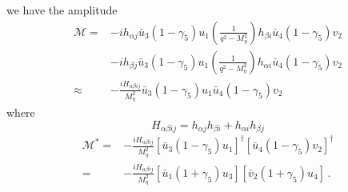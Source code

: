 we have the amplitude 
\begin{align}
  \mathcal{M}=&-i
  h_{\alpha j}\bar{u}_3(1-\gamma_5)u_1\left(\frac{1}{q^2-M_\eta^2}\right)h_{\beta i}\bar{u}_4(1-\gamma_5)v_2\nonumber\\
  &-i h_{\beta j}\bar{u}_3(1-\gamma_5)u_1\left(\frac{1}{q^2-M_\eta^2}\right)h_{\alpha i}\bar{u}_4(1-\gamma_5)v_2\nonumber\\
  \approx&-\frac{iH_{\alpha\beta ij}}{{M_\eta^2}}\bar{u}_3(1-\gamma_5)u_1\bar{u}_4(1-\gamma_5)v_2
\end{align}
where
\begin{equation}
  H_{\alpha\beta ij}=h_{\alpha j}h_{\beta i}+h_{\alpha i}h_{\beta j}
\end{equation}
\begin{align}
   \mathcal{M}^*=&-\frac{iH_{\alpha\beta ij}}{{M_\eta^2}}
   [\bar{u}_3(1-\gamma_5)u_1]^\dagger[\bar{u}_4(1-\gamma_5)v_2]^\dagger\nonumber\\
   =&-\frac{iH_{\alpha\beta ij}}{{M_\eta^2}}[\bar{u}_1(1+\gamma_5)u_3][\bar{v}_2(1+\gamma_5)u_4]\,.
\end{align}

